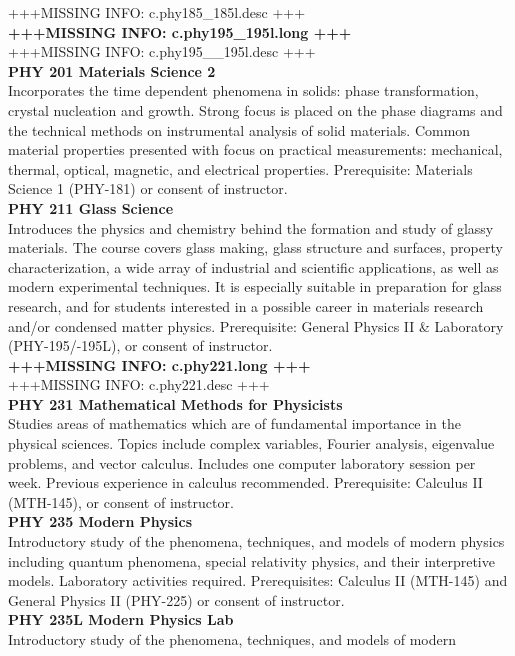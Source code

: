 \documentclass[
  letterpaper,
]{scrbook}
\begin{document}
+++MISSING INFO: c.phy185\_185l.desc +++\\
\textbf{+++MISSING INFO: c.phy195\_195l.long +++}\\
+++MISSING INFO: c.phy195\_\_195l.desc +++\\
\textbf{PHY 201 Materials Science 2}\\
Incorporates the time dependent phenomena in solids: phase
transformation, crystal nucleation and growth. Strong focus is placed on
the phase diagrams and the technical methods on instrumental analysis of
solid materials. Common material properties presented with focus on
practical measurements: mechanical, thermal, optical, magnetic, and
electrical properties. Prerequisite: Materials Science 1 (PHY-181) or
consent of instructor.\\
\textbf{PHY 211 Glass Science}\\
Introduces the physics and chemistry behind the formation and study of
glassy materials. The course covers glass making, glass structure and
surfaces, property characterization, a wide array of industrial and
scientific applications, as well as modern experimental techniques. It
is especially suitable in preparation for glass research, and for
students interested in a possible career in materials research and/or
condensed matter physics. Prerequisite: General Physics II \& Laboratory
(PHY-195/-195L), or consent of instructor.\\
\textbf{+++MISSING INFO: c.phy221.long +++}\\
+++MISSING INFO: c.phy221.desc +++\\
\textbf{PHY 231 Mathematical Methods for Physicists}\\
Studies areas of mathematics which are of fundamental importance in the
physical sciences. Topics include complex variables, Fourier analysis,
eigenvalue problems, and vector calculus. Includes one computer
laboratory session per week. Previous experience in calculus
recommended. Prerequisite: Calculus II (MTH-145), or consent of
instructor.\\
\textbf{PHY 235 Modern Physics}\\
Introductory study of the phenomena, techniques, and models of modern
physics including quantum phenomena, special relativity physics, and
their interpretive models. Laboratory activities required.
Prerequisites: Calculus II (MTH-145) and General Physics II (PHY-225) or
consent of instructor.\\
\textbf{PHY 235L Modern Physics Lab}\\
Introductory study of the phenomena, techniques, and models of modern
\end{document}
